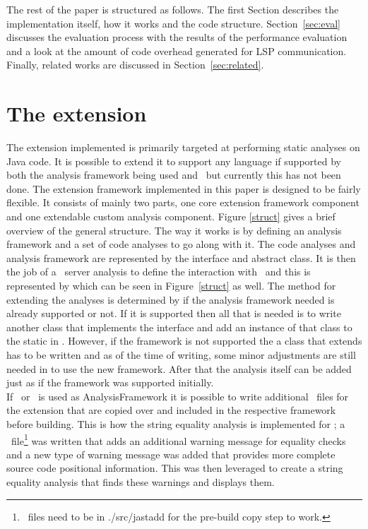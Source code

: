 \documentclass[sigplan,10pt]{acmart}
\begin{document}
The rest of the paper is structured as follows. The first Section describes the implementation itself, how it works and the code structure. Section~\ref{sec:eval} discusses the evaluation process with the results of the performance evaluation and a look at the amount of code overhead generated for LSP communication. Finally, related works are discussed in Section~\ref{sec:related}.

\section{The extension}
The extension implemented is primarily targeted at performing static analyses on Java code. It is possible to extend it to support any language if supported by both the analysis framework being used and \magpie\ but currently this has not been done.
The extension framework implemented in this paper is designed to be fairly flexible. It consists of mainly two parts, one core extension framework component and one extendable custom analysis component. Figure \ref{struct} gives a brief overview of the general structure. The way it works is by defining an analysis framework and a set of code analyses to go along with it. The code analyses and analysis framework are represented by the  interface and  abstract class. It is then the job of a \magpie\ server analysis to define the interaction with \magpie\ and this is represented by  which can be seen in Figure~\ref{struct} as well. The method for extending the analyses is determined by if the analysis framework needed is already supported or not. If it is supported then all that is needed is to write another class that implements the  interface and add an instance of that class to the static  in . However, if the framework is not supported the a class that extends  has to be written and as of the time of writing, some minor adjustments are still needed in  to use the new framework. After that the analysis itself can be added just as if the framework was supported initially.
\\
If \intraj\ or \extendj\ is used as AnalysisFramework it is possible to write additional \jastadd\ files for the extension that are copied over and included in the respective framework before building. This is how the string equality analysis is implemented for \intraj; a \jastadd\ file\footnote{\jastadd\ files need to be in ./src/jastadd for the pre-build copy step to work.} was written that adds an additional warning message for equality checks and a new type of warning message was added that provides more complete source code positional information. This was then leveraged to create a string equality analysis that finds these warnings and displays them.
\end{document}
